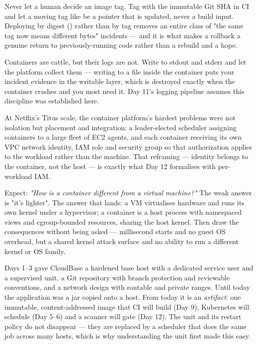 \begin{autotip}
Never let a human decide an image tag. Tag with the immutable Git SHA in CI and let a moving tag like  be a pointer that is updated, never a build input. Deploying by digest () rather than by tag removes an entire class of "the same tag now means different bytes" incidents --- and it is what makes a rollback a genuine return to previously-running code rather than a rebuild and a hope.
\end{autotip}

\begin{opsnote}
Containers are cattle, but their logs are not. Write to stdout and stderr and let the platform collect them --- writing to a file inside the container puts your incident evidence in the writable layer, which is destroyed exactly when the container crashes and you most need it. Day 11's logging pipeline assumes this discipline was established here.
\end{opsnote}

\begin{scalenote}
At Netflix's Titus scale, the container platform's hardest problems were not isolation but placement and integration: a leader-elected scheduler assigning containers to a large fleet of EC2 agents, and each container receiving its own VPC network identity, IAM role and security group so that authorization applies to the workload rather than the machine. That reframing --- identity belongs to the container, not the host --- is exactly what Day 12 formalises with per-workload IAM.
\end{scalenote}

\begin{interview}
Expect: \emph{"How is a container different from a virtual machine?"} The weak answer is "it's lighter". The answer that lands: a VM virtualises hardware and runs its own kernel under a hypervisor; a container is a host process with namespaced views and cgroup-bounded resources, sharing the host kernel. Then draw the consequences without being asked --- millisecond starts and no guest OS overhead, but a shared kernel attack surface and no ability to run a different kernel or OS family.
\end{interview}


Days 1--3 gave CloudBase a hardened base host with a dedicated service user and a supervised  unit, a Git repository with branch protection and reviewable conventions, and a network design with routable and private ranges. Until today the application was a jar copied onto a host. From today it is an \emph{artifact}: one immutable, content-addressed image that CI will build (Day 9), Kubernetes will schedule (Day 5--6) and a scanner will gate (Day 12). The  unit and its restart policy do not disappear --- they are replaced by a scheduler that does the same job across many hosts, which is why understanding the unit first made this easy.

